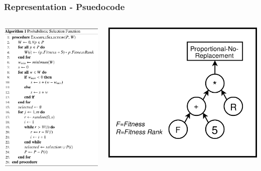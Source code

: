 \documentclass{beamer}
\begin{document}
	\begin{frame}
		\frametitle{Representation - Psuedocode}
		\begin{columns}
		\begin{column}{0.5\textwidth}
			\includegraphics[height=0.8\paperheight]{example_eppsea_code}		
		\end{column}
		\begin{column}{0.5\textwidth}
			\includegraphics[width=\textwidth]{example_eppsea_no_forks}		

\end{column}
\end{columns}
\end{frame}
\end{document}
